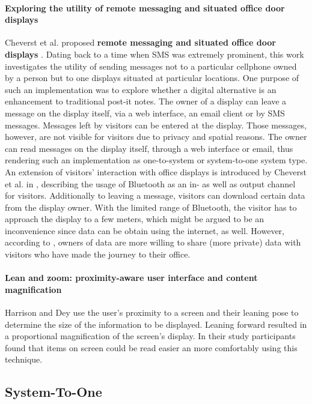 \paragraph{Exploring the utility of remote messaging and situated office door displays}
Cheverst et al. proposed \textbf{remote messaging and situated office door displays} \cite{cheverst2003exploring}.
Dating back to a time when SMS was extremely prominent, this work investigates the utility of sending messages not to a particular cellphone owned by a person but to one displays situated at particular locations.
One purpose of such an implementation was to explore whether a digital alternative is an enhancement to traditional post-it notes.
The owner of a display can leave a message on the display itself, via a web interface, an email client or by SMS messages.
Messages left by visitors can be entered at the display.
Those messages, however, are not visible for visitors due to privacy and spatial reasons.
The owner can read messages on the display itself, through a web interface or email, thus rendering such an implementation as one-to-system or system-to-one system type.
An extension of visitors’ interaction with office displays is introduced by Cheverst et al. in \cite{cheverst2005exploring}, describing the usage of Bluetooth as an in- as well as output channel for visitors.
Additionally to leaving a message, visitors can download certain data from the display owner.
With the limited range of Bluetooth, the visitor has to approach the display to a few meters, which might be argued to be an inconvenience since data can be obtain using the internet, as well.
However, according to \cite{cheverst2005exploring}, owners of data are more willing to share (more private) data with visitors who have made the journey to their office.

\paragraph{Lean and zoom: proximity-aware user interface and content magnification}
Harrison and Dey \cite{harrison_lean_2008} use the user's proximity to a screen and their leaning pose to determine the size of the information to be displayed.
Leaning forward resulted in a proportional magnification of the screen's display.
In their study participants found that items on screen could be read easier an more comfortably using this technique.


\subsection{System-To-One}

